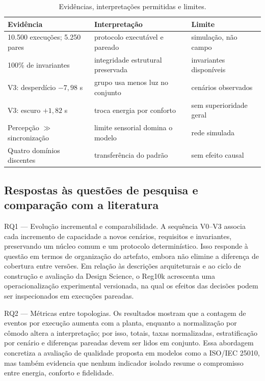\documentclass[10pt,a4paper]{article}
\begin{document}
\begin{table}[ht]
\centering
\caption{Evidências, interpretações permitidas e limites.}
\label{tab:evidencias}
\small
\begin{tabularx}{\linewidth}{p{3.5cm}X p{3.5cm}}
\toprule
Evidência & Interpretação & Limite \\
\midrule
10.500 execuções; 5.250 pares & protocolo executável e pareado & simulação, não campo \\
100\% de invariantes & integridade estrutural preservada & invariantes disponíveis \\
V3: desperdício $-7{,}98$ s & grupo usa menos luz no conjunto & cenários observados \\
V3: escuro $+1{,}82$ s & troca energia por conforto & sem superioridade geral \\
Percepção $\gg$ sincronização & limite sensorial domina o modelo & rede simulada \\
Quatro domínios discentes & transferência do padrão & sem efeito causal \\
\bottomrule
\end{tabularx}
\end{table}

\subsection{Respostas às questões de pesquisa e comparação com a literatura}


RQ1 — Evolução incremental e comparabilidade. A sequência V0--V3 associa cada incremento de capacidade a novos cenários, requisitos e invariantes, preservando um núcleo comum e um protocolo determinístico. Isso responde à questão em termos de organização do artefato, embora não elimine a diferença de cobertura entre versões. Em relação às descrições arquiteturais e ao ciclo de construção e avaliação da Design Science, o Reg10k acrescenta uma operacionalização experimental versionada, na qual os efeitos das decisões podem ser inspecionados em execuções pareadas. \citep{iso42010,hevner2004,peffers2007}

RQ2 — Métricas entre topologias. Os resultados mostram que a contagem de eventos por execução aumenta com a planta, enquanto a normalização por cômodo altera a interpretação; por isso, totais, taxas normalizadas, estratificação por cenário e diferenças pareadas devem ser lidos em conjunto. Essa abordagem concretiza a avaliação de qualidade proposta em modelos como a ISO/IEC 25010, mas também evidencia que nenhum indicador isolado resume o compromisso entre energia, conforto e fidelidade. \citep{iso25010}
\end{document}
